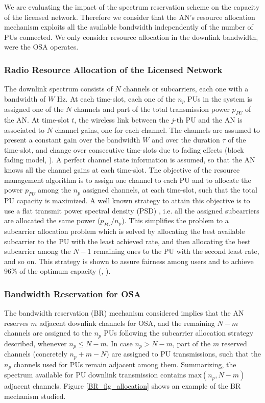 We are evaluating the impact of the spectrum reservation scheme on the capacity of the licensed network. Therefore we consider that the AN's resource allocation mechanism exploits all the available bandwidth independently of the number of PUs connected.
We only consider resource allocation in the downlink bandwidth, were the OSA operates.

\subsubsection{Radio Resource Allocation of the Licensed Network} 
The downlink spectrum consists of $N$ channels or subcarriers, each one with a bandwidth of $W$ Hz. At each time-slot, each one of the $n_{p}$ PUs in the system is assigned one of the $N$ channels and part of the total transmission power $p_{PU}$ of the AN.
At time-slot $t$, the wireless link between the $j$-th PU and the AN is associated to $N$ channel gains, one for each channel. The channels are assumed to present a constant gain over the bandwidth $W$ and over the duration $\tau$ of the time-slot, and change over consecutive time-slots due to fading effects (block fading model, \cite{ref:Goldsmith}).
A perfect channel state information is assumed, so that the AN knows all the channel gains at each time-slot.
The objective of the resource management algorithm is to assign one channel to each PU and to allocate the power $p_{PU}$ among the $n_{p}$ assigned channels, at each time-slot, such that the total PU capacity is maximized.
A well known strategy to attain this objective is to use a flat transmit power spectral density (PSD) \cite{ref:PSD}, i.e. all the assigned subcarriers are allocated the same power ($p_{PU}/n_{p}$). This simplifies the problem to a subcarrier allocation problem which is solved by allocating the best available subcarrier to the PU with the least achieved rate, and then allocating the best subcarrier among the $N-1$ remaining ones to the PU with the second least rate, and so on. This strategy is shown to assure fairness among users and to achieve 96\% of the optimum capacity (\cite{ref:PSD}, \cite{ref:OFDMtutorial}).

\subsubsection{Bandwidth Reservation for OSA} 
The bandwidth reservation (BR) mechanism considered implies that the AN reserves $m$ adjacent downlink channels for OSA, and the remaining $N-m$ channels are assigned to the $n_{p}$ PUs following the subcarrier allocation strategy described, whenever $n_{p}\leq N-m$. In case $n_{p}>N-m$, part of the $m$ reserved channels (concretely $n_{p}+m-N$) are assigned to PU transmissions, such that the $n_{p}$ channels used for PUs remain adjacent among them. Summarizing, the spectrum available for PU downlink transmission contains $\text{max}\left(n_{p},N-m\right)$ adjacent channels. Figure \ref{BR_fig_allocation} shows an example of the BR mechanism studied.

